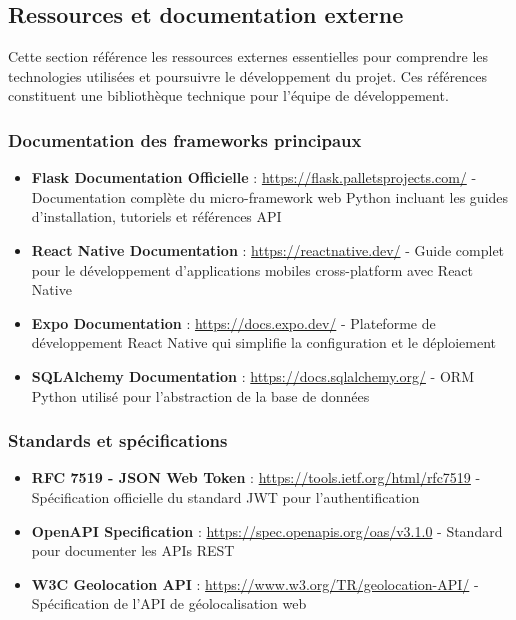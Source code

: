 \subsection{Ressources et documentation externe}

Cette section référence les ressources externes essentielles pour comprendre les technologies utilisées et poursuivre le développement du projet. Ces références constituent une bibliothèque technique pour l'équipe de développement.

\subsubsection{Documentation des frameworks principaux}

\begin{itemize}[leftmargin=1cm]
\item \textbf{Flask Documentation Officielle} : \url{https://flask.palletsprojects.com/} - Documentation complète du micro-framework web Python incluant les guides d'installation, tutoriels et références API
\item \textbf{React Native Documentation} : \url{https://reactnative.dev/} - Guide complet pour le développement d'applications mobiles cross-platform avec React Native
\item \textbf{Expo Documentation} : \url{https://docs.expo.dev/} - Plateforme de développement React Native qui simplifie la configuration et le déploiement
\item \textbf{SQLAlchemy Documentation} : \url{https://docs.sqlalchemy.org/} - ORM Python utilisé pour l'abstraction de la base de données
\end{itemize}

\subsubsection{Standards et spécifications}

\begin{itemize}[leftmargin=1cm]
\item \textbf{RFC 7519 - JSON Web Token} : \url{https://tools.ietf.org/html/rfc7519} - Spécification officielle du standard JWT pour l'authentification
\item \textbf{OpenAPI Specification} : \url{https://spec.openapis.org/oas/v3.1.0} - Standard pour documenter les APIs REST
\item \textbf{W3C Geolocation API} : \url{https://www.w3.org/TR/geolocation-API/} - Spécification de l'API de géolocalisation web
\end{itemize}


